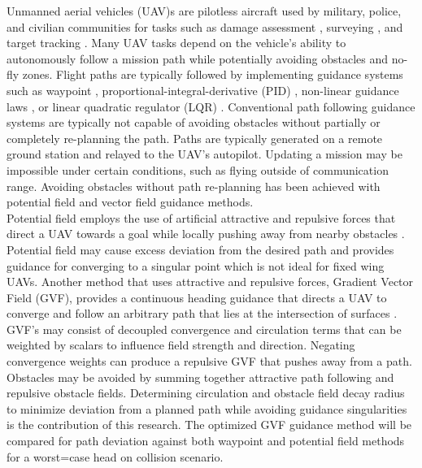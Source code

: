 \documentclass[conf]{new-aiaa}
\begin{document}
Unmanned aerial vehicles (UAV)s are pilotless aircraft used by military, police, and civilian communities for tasks such as damage assessment \cite{fernandez_galarreta_uav-based_2015}, surveying \cite{remondino_uav_2012}, and target tracking \cite{frew_cooperative_2007,oh_coordinated_2013,hyondong_oh_coordinated_2015,oliveira_moving_2016}. Many UAV tasks depend on the vehicle's ability to autonomously follow a mission path while potentially avoiding obstacles and no-fly zones. Flight paths are typically followed by implementing guidance systems such as waypoint \cite{osborne_waypoint_2005}, proportional-integral-derivative (PID) \cite{rhee2010tight}, non-linear guidance laws \cite{park2007performance}, or linear quadratic regulator (LQR) \cite{ratnoo_adaptive_2011}. Conventional path following guidance systems are typically not capable of avoiding obstacles without partially or completely re-planning the path. Paths are typically generated on a remote ground station and relayed to the UAV’s autopilot. Updating a mission may be impossible under certain conditions, such as flying outside of communication range. Avoiding obstacles without path re-planning has been achieved with potential field \cite{borenstein_real-time_1990,borenstein_vector_1991} and vector field \cite{frew_cooperative_2007,griffiths_vector_2006,goncalves_artificial_2009,goncalves_circulation_2010,goncalves_vector_2010} guidance methods.\\

 Potential field employs the use of artificial attractive and repulsive forces that direct a UAV towards a goal while locally pushing away from nearby obstacles \cite{khatib_real-time_1986}. Potential field may cause excess deviation from the desired path and provides guidance for converging to a singular point \cite{borenstein_real-time_1990,borenstein_vector_1991} which is not ideal for fixed wing UAVs. Another method that uses attractive and repulsive forces, Gradient Vector Field (GVF), provides a continuous heading guidance that directs a UAV to converge and follow an arbitrary path that lies at the intersection of surfaces \cite{goncalves_artificial_2009,goncalves_circulation_2010,goncalves_vector_2010}. \\

GVF's may consist of decoupled convergence and circulation terms that can be weighted by scalars to influence field strength and direction. Negating convergence weights can produce a repulsive GVF that pushes away from a path. Obstacles may be avoided by summing together attractive path following and repulsive obstacle fields. Determining circulation and obstacle field decay radius to minimize deviation from a planned path while avoiding guidance singularities is the contribution of this research. The optimized GVF guidance method will be compared for path deviation against both waypoint and potential field methods for a worst=case head on collision scenario. 
\end{document}
